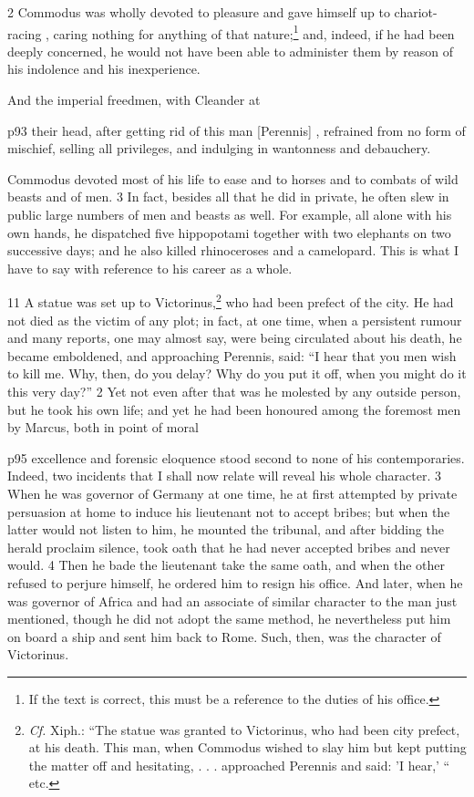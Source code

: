 2
Commodus was wholly devoted to pleasure and gave himself up to chariot-racing , caring nothing for anything of that nature;\texthebrew{⁠}\footnote{If the text is correct, this must be a reference to the duties of his office.

} and, indeed, if he had been deeply concerned, he would not have been able to administer them by reason of his indolence and his inexperience.

And the imperial freedmen, with Cleander at

p93 their head, after getting rid of this man [Perennis] , refrained from no form of mischief, selling all privileges, and indulging in wantonness and debauchery.

Commodus devoted most of his life to ease and to horses and to combats of wild beasts and of men. 3 In fact, besides all that he did in private, he often slew in public large numbers of men and beasts as well. For example, all alone with his own hands, he dispatched five hippopotami together with two elephants on two successive days; and he also killed rhinoceroses and a camelopard. This is what I have to say with reference to his career as a whole.

11
A statue was set up to Victorinus,\texthebrew{⁠}\footnote{\emph{Cf.} Xiph.: ``The statue was granted to Victorinus, who had been city prefect, at his death. This man, when Commodus wished to slay him but kept putting the matter off and hesitating, . . . approached Perennis and said: 'I hear,' `` etc.

} who had been prefect of the city. He had not died as the victim of any plot; in fact, at one time, when a persistent rumour and many reports, one may almost say, were being circulated about his death, he became emboldened, and approaching Perennis, said: ``I hear that you men wish to kill me. Why, then, do you delay? Why do you put it off, when you might do it this very day?'' 2 Yet not even after that was he molested by any outside person, but he took his own life; and yet he had been honoured among the foremost men by Marcus, both in point of moral

p95 excellence and forensic eloquence stood second to none of his contemporaries. Indeed, two incidents that I shall now relate will reveal his whole character. 3 When he was governor of Germany at one time, he at first attempted by private persuasion at home to induce his lieutenant not to accept bribes; but when the latter would not listen to him, he mounted the tribunal, and after bidding the herald proclaim silence, took oath that he had never accepted bribes and never would. 4 Then he bade the lieutenant take the same oath, and when the other refused to perjure himself, he ordered him to resign his office. And later, when he was governor of Africa and had an associate of similar character to the man just mentioned, though he did not adopt the same method, he nevertheless put him on board a ship and sent him back to Rome. Such, then, was the character of Victorinus.

